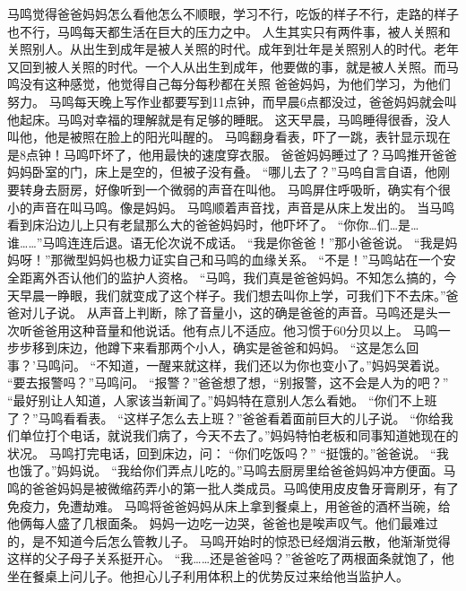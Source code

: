 \documentclass[a4paper,12pt,UTF8,twoside]{ctexbook}
\begin{document}
        马鸣觉得爸爸妈妈怎么看他怎么不顺眼，学习不行，吃饭的样子不行，走路的样子也不行，马鸣每天都生活在巨大的压力之中。  
        人生其实只有两件事，被人关照和关照别人。从出生到成年是被人关照的时代。成年到壮年是关照别人的时代。老年又回到被人关照的时代。一个人从出生到成年，他要做的事，就是被人关照。而马鸣没有这种感觉，他觉得自己每分每秒都在关照   爸爸妈妈，为他们学习，为他们努力。  
        马鸣每天晚上写作业都要写到11点钟，而早晨6点都没过，爸爸妈妈就会叫他起床。马鸣对幸福的理解就是有足够的睡眠。  
        这天早晨，马鸣睡得很香，没人叫他，他是被照在脸上的阳光叫醒的。  
        马鸣翻身看表，吓了一跳，表针显示现在是8点钟！马鸣吓坏了，他用最快的速度穿衣服。  
        爸爸妈妈睡过了？马鸣推开爸爸妈妈卧室的门，床上是空的，但被子没有叠。  
        “哪儿去了？”马呜自言自语，他刚要转身去厨房，好像听到一个微弱的声音在叫他。  
        马鸣屏住呼吸昕，确实有个很小的声音在叫马鸣。像是妈妈。  
        马鸣顺着声音找，声音是从床上发出的。  
        当马鸣看到床沿边儿上只有老鼠那么大的爸爸妈妈时，他吓坏了。  
        “你你…们…是…谁……”马鸣连连后退。语无伦次说不成话。  
        “我是你爸爸！”那小爸爸说。  
        “我是妈妈呀！”那微型妈妈也极力证实自己和马鸣的血缘关系。  
        “不是！”马鸣站在一个安全距离外否认他们的监护人资格。        
        “马鸣，我们真是爸爸妈妈。不知怎么搞的，今天早晨一睁眼，我们就变成了这个样子。我们想去叫你上学，可我们下不去床。”爸爸对儿子说。  
        从声音上判断，除了音量小，这的确是爸爸的声音。马鸣还是头一次听爸爸用这种音量和他说话。他有点儿不适应。他习惯于60分贝以上。  
        马鸣一步步移到床边，他蹲下来看那两个小人，确实是爸爸和妈妈。  
        “这是怎么回事？’马鸣问。  
        “不知道，一醒来就这样，我们还以为你也变小了。”妈妈哭着说。  
        “要去报警吗？”马鸣问。  
        “报警？”爸爸想了想，“别报警，这不会是人为的吧？”  
        “最好别让人知道，人家该当新闻了。”妈妈特在意别人怎么看她。  
        “你们不上班了？”马鸣看看表。  
        “这样子怎么去上班？”爸爸看着面前巨大的儿子说。  
        “你给我们单位打个电话，就说我们病了，今天不去了。”妈妈特怕老板和同事知道她现在的状况。  
        马鸣打完电话，回到床边，问：  
        “你们吃饭吗？”  
        “挺饿的。”爸爸说。        
        “我也饿了。”妈妈说。  
        “我给你们弄点儿吃的。”马鸣去厨房里给爸爸妈妈冲方便面。马鸣的爸爸妈妈是被微缩药弄小的第一批人类成员。马鸣使用皮皮鲁牙膏刷牙，有了免疫力，免遭劫难。  
        马鸣将爸爸妈妈从床上拿到餐桌上，用爸爸的酒杯当碗，给他俩每人盛了几根面条。  
        妈妈一边吃一边哭，爸爸也是唉声叹气。他们最难过的，是不知道今后怎么管教儿子。  
        马鸣开始时的惊恐已经烟消云散，他渐渐觉得这样的父子母子关系挺开心。  
        “我……还是爸爸吗？”爸爸吃了两根面条就饱了，他坐在餐桌上问儿子。他担心儿子利用体积上的优势反过来给他当监护人。  
\end{document}
